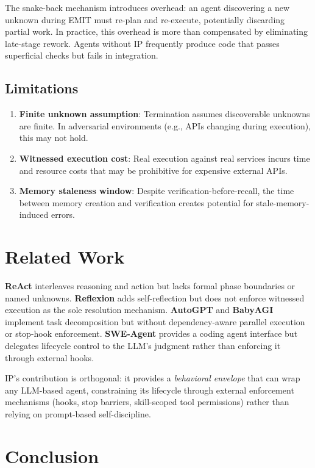 \documentclass[11pt,twocolumn]{article}
\begin{document}
The snake-back mechanism introduces overhead: an agent discovering a new unknown during EMIT must re-plan and re-execute, potentially discarding partial work. In practice, this overhead is more than compensated by eliminating late-stage rework. Agents without IP frequently produce code that passes superficial checks but fails in integration.

\subsection{Limitations}

\begin{enumerate}[nosep]
    \item \textbf{Finite unknown assumption}: Termination assumes discoverable unknowns are finite. In adversarial environments (e.g., APIs changing during execution), this may not hold.
    \item \textbf{Witnessed execution cost}: Real execution against real services incurs time and resource costs that may be prohibitive for expensive external APIs.
    \item \textbf{Memory staleness window}: Despite verification-before-recall, the time between memory creation and verification creates potential for stale-memory-induced errors.
\end{enumerate}

\section{Related Work}

\textbf{ReAct} \cite{yao2023react} interleaves reasoning and action but lacks formal phase boundaries or named unknowns. \textbf{Reflexion} \cite{shinn2023reflexion} adds self-reflection but does not enforce witnessed execution as the sole resolution mechanism. \textbf{AutoGPT} and \textbf{BabyAGI} implement task decomposition but without dependency-aware parallel execution or stop-hook enforcement. \textbf{SWE-Agent} \cite{yang2024sweagent} provides a coding agent interface but delegates lifecycle control to the LLM's judgment rather than enforcing it through external hooks.

IP's contribution is orthogonal: it provides a \emph{behavioral envelope} that can wrap any LLM-based agent, constraining its lifecycle through external enforcement mechanisms (hooks, stop barriers, skill-scoped tool permissions) rather than relying on prompt-based self-discipline.

\section{Conclusion}
\end{document}
